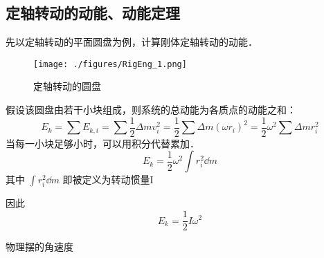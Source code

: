 
\begin{issues}
\issueDraft
\end{issues}


\subsection{定轴转动的动能、动能定理}
先以定轴转动的平面圆盘为例，计算刚体定轴转动的动能．
\begin{figure}[ht]
\centering
\texttt{[image: ./figures/RigEng\_1.png]}
\caption{定轴转动的圆盘} \label{RigEng_fig1}
\end{figure}
假设该圆盘由若干小块组成，则系统的总动能为各质点的动能之和：
\begin{equation}
E_k=\sum E_{k,i}=\sum \frac{1}{2} \Delta m v_i^2=\frac{1}{2} \sum \Delta m (\omega r_i)^2=\frac{1}{2} \omega^2 \sum \Delta m r_i^2
\end{equation}
当每一小块足够小时，可以用积分代替累加．
\begin{equation}
E_k=\frac{1}{2} \omega^2 \int r_i^2 \dd m 
\end{equation}
其中 $\int r_i^2 \dd m$ 即被定义为转动惯量I

因此
\begin{equation}
E_k=\frac{1}{2} I \omega^2
\end{equation}


\begin{example}{物理摆的角速度}\label{RigEng_ex1}
\end{example}
